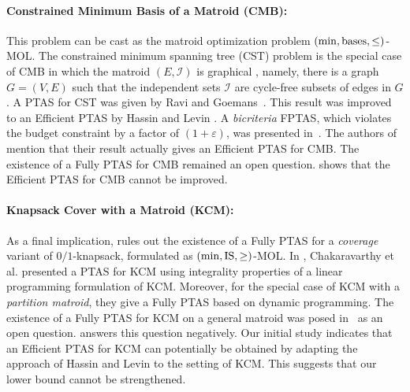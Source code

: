 \documentclass[11pt,letter]{article}
\newcommand{\bases}{\textnormal{bases}}
\newcommand{\IS}{\textnormal{IS}}
\newcommand{\cI}{{\mathcal{I}}}
\newcommand{\eps}{{\varepsilon}}
\begin{document}

\paragraph{Constrained Minimum Basis of a Matroid (CMB):} This problem can be cast as the matroid optimization problem $(\min,\bases,\leq)$-MOL. 
The {\sc constrained minimum spanning tree (CST)} problem is the  special case of CMB in which the matroid $(E,\cI)$ is graphical \cite{RG96, andersen1996bicriterion,HL04,hong2004fully}, namely, there is a graph $G=(V,E)$ such that  
the independent sets $\cI$ are cycle-free subsets of edges in $G$.
A PTAS for CST was given by Ravi and Goemans~\cite{RG96}. This result was improved to an Efficient PTAS by Hassin and Levin \cite{HL04}. A {\em bicriteria} FPTAS, which violates the budget constraint by a factor of $(1+\eps)$, was presented in~\cite{hong2004fully}. The authors of~\cite{HL04} mention that their result actually gives an Efficient PTAS for CMB. 
The existence of a Fully PTAS for CMB remained an open question.  shows that the Efficient PTAS for CMB cannot be improved.
 
\paragraph{Knapsack Cover with a Matroid (KCM):}
As a final implication,  rules out the existence of a Fully PTAS for a  {\em coverage} variant of $0/1${\sc-knapsack}, formulated as $(\min,\IS,\geq)$-MOL. 
In \cite{CCNR13}, Chakaravarthy et al. presented a PTAS for KCM using integrality properties of a linear programming formulation of KCM. Moreover, for the special case of KCM with a {\em partition matroid}, they give a Fully PTAS based on dynamic programming. The existence of  a Fully PTAS for KCM  on a general matroid was posed in~\cite{CCNR13} as an open question.  answers this question negatively.
Our initial study indicates that an Efficient PTAS  for KCM can potentially be obtained by adapting the approach of Hassin and Levin \cite{HL04} to the setting of KCM. This suggests that our lower bound cannot be strengthened. 
\end{document}
